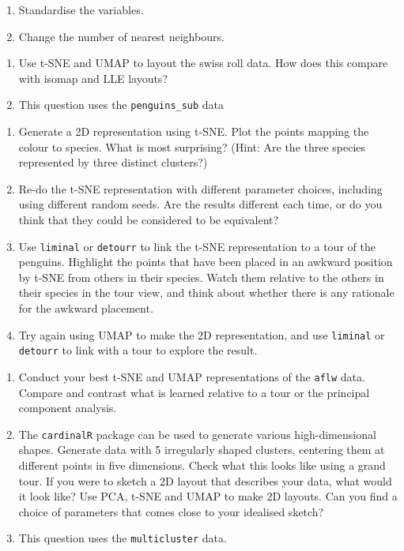 \documentclass[
  letterpaper,
]{krantz}
\providecommand{\tightlist}{%
  \setlength{\itemsep}{0pt}\setlength{\parskip}{0pt}}\usepackage{longtable,booktabs,array}
\begin{document}
\begin{enumerate}
\def\labelenumi{\alph{enumi}.}
\item
  Standardise the variables.
\item
  Change the number of nearest neighbours.
\end{enumerate}

\begin{enumerate}
\def\labelenumi{\arabic{enumi}.}
\setcounter{enumi}{2}
\item
  Use t-SNE and UMAP to layout the swiss roll data. How does this
  compare with isomap and LLE layouts?
\item
  This question uses the \texttt{penguins\_sub} data
\end{enumerate}

\begin{enumerate}
\def\labelenumi{\alph{enumi}.}
\tightlist
\item
  Generate a 2D representation using t-SNE. Plot the points mapping the
  colour to species. What is most surprising? (Hint: Are the three
  species represented by three distinct clusters?)
\item
  Re-do the t-SNE representation with different parameter choices,
  including using different random seeds. Are the results different each
  time, or do you think that they could be considered to be equivalent?
\item
  Use \texttt{liminal} or \texttt{detourr} to link the t-SNE
  representation to a tour of the penguins. Highlight the points that
  have been placed in an awkward position by t-SNE from others in their
  species. Watch them relative to the others in their species in the
  tour view, and think about whether there is any rationale for the
  awkward placement.
\item
  Try again using UMAP to make the 2D representation, and use
  \texttt{liminal} or \texttt{detourr} to link with a tour to explore
  the result.
\end{enumerate}

\begin{enumerate}
\def\labelenumi{\arabic{enumi}.}
\setcounter{enumi}{4}
\item
  Conduct your best t-SNE and UMAP representations of the \texttt{aflw}
  data. Compare and contrast what is learned relative to a tour or the
  principal component analysis.
\item
  The \texttt{cardinalR} package can be used to generate various
  high-dimensional shapes. Generate data with 5 irregularly shaped
  clusters, centering them at different points in five dimensions. Check
  what this looks like using a grand tour. If you were to sketch a 2D
  layout that describes your data, what would it look like? Use PCA,
  t-SNE and UMAP to make 2D layouts. Can you find a choice of parameters
  that comes close to your idealised sketch?
\item
  This question uses the \texttt{multicluster} data.
\end{enumerate}
\end{document}

